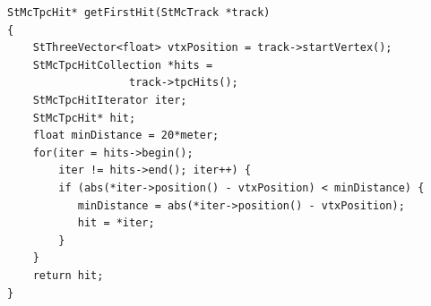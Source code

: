 \begin{Entry}
{\begin{verbatim}
StMcTpcHit* getFirstHit(StMcTrack *track)
{
    StThreeVector<float> vtxPosition = track->startVertex();
    StMcTpcHitCollection *hits =
                   track->tpcHits();
    StMcTpcHitIterator iter;
    StMcTpcHit* hit;
    float minDistance = 20*meter;
    for(iter = hits->begin();
        iter != hits->end(); iter++) {
        if (abs(*iter->position() - vtxPosition) < minDistance) {
           minDistance = abs(*iter->position() - vtxPosition);
           hit = *iter;
        }
    }
    return hit;
}

\end{verbatim}
}%
\end{Entry}
\clearpage
%
%

